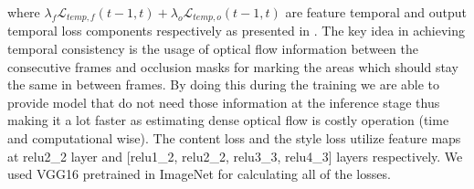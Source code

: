 \documentclass[a4paper,conference]{IEEEtran}
\begin{document}
where $\lambda_{f} \mathcal{L}_{temp,f}(t-1,t) + \lambda_{o} \mathcal{L}_{temp,o}(t-1,t)$ are feature temporal and output temporal loss components respectively as presented in \cite{Reconet}. The key idea in achieving temporal consistency is the usage of optical flow information between the consecutive frames and occlusion masks for marking the areas which should stay the same in between frames. By doing this during the training we are able to provide model that do not need those information at the inference stage thus making it a lot faster as estimating dense optical flow is costly operation (time and computational wise). The content loss and the style loss utilize feature maps at relu2\_2 layer and [relu1\_2, relu2\_2, relu3\_3, relu4\_3] layers respectively. We used VGG16 pretrained in ImageNet for calculating all of the losses.










\end{document}
